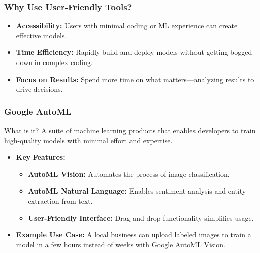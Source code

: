 \documentclass[aspectratio=169]{beamer}
\begin{document}
\begin{frame}
    \frametitle{Why Use User-Friendly Tools?}
    \begin{itemize}
        \item \textbf{Accessibility:} Users with minimal coding or ML experience can create effective models.
        \item \textbf{Time Efficiency:} Rapidly build and deploy models without getting bogged down in complex coding.
        \item \textbf{Focus on Results:} Spend more time on what matters—analyzing results to drive decisions.
    \end{itemize}
\end{frame}

\begin{frame}
    \frametitle{Google AutoML}
    \begin{block}{What is it?}
        A suite of machine learning products that enables developers to train high-quality models with minimal effort and expertise.
    \end{block}
    \begin{itemize}
        \item \textbf{Key Features:}
        \begin{itemize}
            \item \textbf{AutoML Vision:} Automates the process of image classification.
            \item \textbf{AutoML Natural Language:} Enables sentiment analysis and entity extraction from text.
            \item \textbf{User-Friendly Interface:} Drag-and-drop functionality simplifies usage.
        \end{itemize}
        \item \textbf{Example Use Case:} A local business can upload labeled images to train a model in a few hours instead of weeks with Google AutoML Vision.
    \end{itemize}
\end{frame}
\end{document}
